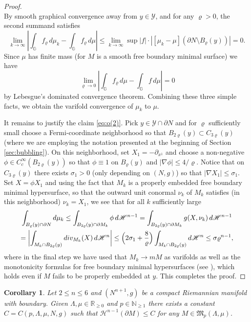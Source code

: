\documentclass[JEP,XML,SOM,Unicode]{cedram}
\let\mathcal\mathscr
\newtheorem{cor}[thm]{Corollary}
\theoremstyle{definition}
\newcommand{\R}{\mathbb{R}}
\newcommand{\N}{\mathbb{N}}
\newcommand{\h}{\mathscr{H}}
\let\D\nabla
\begin{document}
\begin{proof}
\[\]
By smooth graphical convergence away from $y\in\mathcal{Y}$, and for any $\varrho >0$, the second summand satisfies
\[
\lim_{k\to \infty}\left| \int_{\mathbb{G}} f_\varrho\,d\mu_k -\int_{\mathbb{G}} f_\varrho\,d\mu \right|\leq \lim_{k\to \infty} \sup |f|\cdot |[\mu_k-\mu](\partial N \setminus B_{\varrho}(y))| = 0.
\]
Since $\mu$ has finite mass (for $M$ is a smooth free boundary minimal surface) we have
\[
\lim_{\varrho\to 0}\left| \int_{\mathbb{G}} f_\varrho\,d\mu -\int_{\mathbb{G}} f\,d\mu \right|=0
\]
by Lebesgue's dominated convergence theorem.
Combining these three simple facts, we obtain the varifold convergence of $\mu_k$ to $\mu$.

It remains to justify the claim \eqref{eq:o(2)}. Pick $y\in \mathcal{Y}\cap \partial N$ and for $\varrho$ sufficiently small choose a Fermi-coordinate neighborhood so that $B_{2\varrho} (y) \subset C_{3\varrho} (y)$ (where we are employing the notation presented at the beginning of Section \ref{sec:bubbling}). On this neighborhood, set $X_1 = -\partial_{x^1}$ and choose a non-negative $\phi\in C_c^\infty (B_{2\varrho} (y))$ so that $\phi \equiv 1$ on $B_\varrho (y)$ and $|\D \phi| \leq 4/\varrho$. Notice that on $C_{3\varrho}(y)$ there exists $\sigma_1>0$ (only depending on $(N,g)$) so that $|\D X_1 | \leq \sigma_1$. Set $X= \phi X_1$ and using the fact that $M_k$ is a properly embedded free boundary minimal hypersurface, so that the outward unit conormal $\nu_k$ of $M_k$ satisfies (in this neighborhood) $\nu_k = X_1$, we see that for all $k$ sufficiently large
\begin{multline*}
\int_{B_\varrho (y)\cap \partial N} d \mu_k\leq \int_{B_{2\varrho}(y)\cap \partial M_k} \phi \,d\h^{n-1} = \int_{B_{2\varrho}(y)\cap \partial M_k} g(X, \nu_k)\, d\h^{n-1}\\
= \biggl| \int_{M_k\cap B_{2\varrho}(y)} div_{M_k}(X)\, d\h^n \biggr| \leq \Bigl(2\sigma_1+\frac{8}{\varrho}\Bigr)\int_{M_k\cap B_{2\varrho}(y)} d \h^n \leq \sigma \varrho^{n-1},
\end{multline*}
where in the final step we have used that $M_k\to mM$ as varifolds as well as the monotonicity formulas for free boundary minimal hypersurfaces (see \eg \cite[Cor.\,16]{ACS17}), which holds even if $M$ fails to be properly embedded at $y$. This completes the proof.
\end{proof}

\begin{cor}
\label{cor:boundlength}
Let $2\leq n\leq 6$ and $(N^{n+1},g)$ be a compact Riemannian manifold with boundary. Given $\Lambda, \mu\in \R_{\geq 0}$ and $p\in\N_{\geq 1}$ there exists a constant $C=C(p,\Lambda,\mu, N, g)$ such that $\h^{n-1}(\partial M)\leq C$ for any $M\in \mathfrak{M}_p(\Lambda,\mu)$.
\end{cor}
\end{document}
